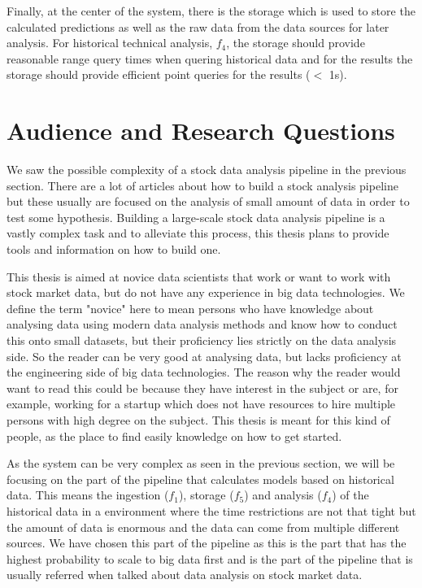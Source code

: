 Finally, at the center of the system, there is the storage which is used to store the calculated predictions as well as the raw data from the data sources for later analysis.
For historical technical analysis, $f_4$, the storage should provide reasonable range query times when quering historical data and for the results the storage should provide efficient point queries for the results ($<$ 1s).

\section{Audience and Research Questions}

We saw the possible complexity of a stock data analysis pipeline in the previous section.
There are a lot of articles about how to build a stock analysis pipeline but these usually are focused on the analysis of small amount of data in order to test some hypothesis.
Building a large-scale stock data analysis pipeline is a vastly complex task and to alleviate this process, this thesis plans to provide tools and information on how to build one.

This thesis is aimed at novice data scientists that work or want to work with stock market data, but do not have any experience in big data technologies.
We define the term "novice" here to mean persons who have knowledge about analysing data using modern data analysis methods and know how to conduct this onto small datasets, but their proficiency lies strictly on the data analysis side.
So the reader can be very good at analysing data, but lacks proficiency at the engineering side of big data technologies.
The reason why the reader would want to read this could be because they have interest in the subject or are, for example, working for a startup which does not have resources to hire multiple persons with high degree on the subject.
This thesis is meant for this kind of people, as the place to find easily knowledge on how to get started.

As the system can be very complex as seen in the previous section, we will be focusing on the part of the pipeline that calculates models based on historical data.
This means the ingestion ($f_1$), storage ($f_5$) and analysis ($f_4$) of the historical data in a environment where the time restrictions are not that tight but the amount of data is enormous and the data can come from multiple different sources.
We have chosen this part of the pipeline as this is the part that has the highest probability to scale to big data first and is the part of the pipeline that is usually referred when talked about data analysis on stock market data.

